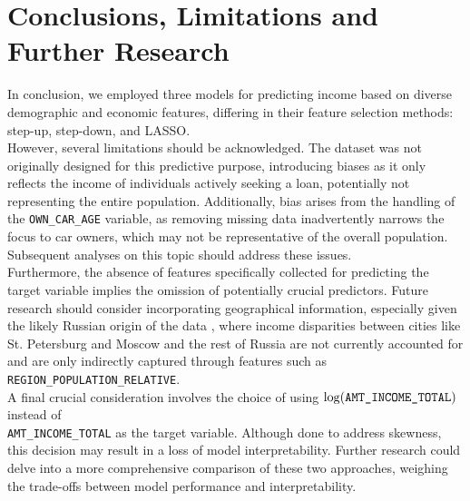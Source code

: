 \documentclass[hidelinks,12pt]{article}
\begin{document}
\section{Conclusions, Limitations and Further Research}
In conclusion, we employed three models for predicting income based on diverse demographic and economic features, differing in their feature selection methods: step-up, step-down, and LASSO.\\
However, several limitations should be acknowledged. The dataset was not originally designed for this predictive purpose, introducing biases as it only reflects the income of individuals actively seeking a loan, potentially not representing the entire population. Additionally, bias arises from the handling of the \verb|OWN_CAR_AGE| variable, as removing missing data inadvertently narrows the focus to car owners, which may not be representative of the overall population. Subsequent analyses on this topic should address these issues.\\
Furthermore, the absence of features specifically collected for predicting the target variable implies the omission of potentially crucial predictors. Future research should consider incorporating geographical information, especially given the likely Russian origin of the data \cite{data-origin}, where income disparities between cities like St. Petersburg and Moscow and the rest of Russia are not currently accounted for and are only indirectly captured through features such as \verb|REGION_POPULATION_RELATIVE|.\\
A final crucial consideration involves the choice of using $\log(\verb|AMT_INCOME_TOTAL|)$ instead of\\ \verb|AMT_INCOME_TOTAL| as the target variable. Although done to address skewness, this decision may result in a loss of model interpretability. Further research could delve into a more comprehensive comparison of these two approaches, weighing the trade-offs between model performance and interpretability.
  
\end{document}
